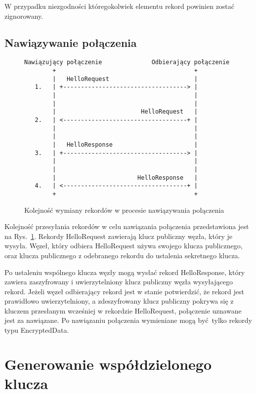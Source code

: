 W przypadku niezgodności któregokolwiek elementu rekord powinien zostać zignorowany.

\subsection{Nawiązywanie połączenia}

\begin{figure}
\centering
\begin{BVerbatim}
Nawiązujący połączenie              Odbierający połączenie
        +                                       +
        |   HelloRequest                        |
   1.   | +-----------------------------------> |
        |                                       |
        |                                       |
        |                        HelloRequest   |
   2.   | <-----------------------------------+ |
        |                                       |
        |                                       |
        |   HelloResponse                       |
   3.   | +-----------------------------------> |
        |                                       |
        |                                       |
        |                       HelloResponse   |
   4.   | <-----------------------------------+ |
        +                                       +
\end{BVerbatim}
\caption{Kolejność wymiany rekordów w procesie nawiązywania połączenia}
\label{fig:handshake}
\end{figure}

Kolejność przesyłania rekordów w celu nawiązania połączenia przedstawiona jest na Rys.~\ref{fig:handshake}. Rekordy HelloRequest zawierają klucz publiczny węzła, który je wysyła. Węzeł, który odbiera HelloRequest używa swojego klucza publicznego, oraz klucza publicznego z odebranego rekordu do ustalenia sekretnego klucza.

Po ustaleniu wspólnego klucza węzły mogą wysłać rekord HelloResponse, który zawiera zaszyfrowany i uwierzytelniony klucz publiczny węzła wysyłającego rekord. Jeżeli węzeł odbierający rekord jest w stanie potwierdzić, że rekord jest prawidłowo uwierzytelniony, a zdeszyfrowany klucz publiczny pokrywa się z kluczem przesłanym wcześniej w rekordzie HelloRequest, połączenie uznawane jest za nawiązane. Po nawiązaniu połączenia wymieniane mogą być tylko rekordy typu EncryptedData.

\section{Generowanie współdzielonego klucza}
\label{sec:sharedkey}

